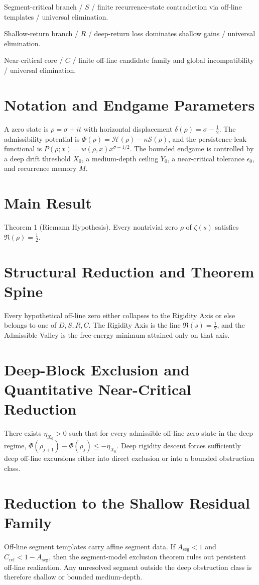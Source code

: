 \documentclass[11pt]{article}
\theoremstyle{definition}
\begin{document}
Segment-critical branch / $S$ / finite recurrence-state contradiction via off-line templates / universal elimination.

Shallow-return branch / $R$ / deep-return loss dominates shallow gains / universal elimination.

Near-critical core / $C$ / finite off-line candidate family and global incompatibility / universal elimination.
\section{Notation and Endgame Parameters}
A zero state is $\rho=\sigma+it$ with horizontal displacement $\delta(\rho)=\sigma-\tfrac12$. The admissibility potential is $\Phi(\rho)=\mathcal H(\rho)-\kappa \mathcal S(\rho)$, and the persistence-leak functional is $P(\rho;x)=w(\rho,x)x^{\sigma-1/2}$. The bounded endgame is controlled by a deep drift threshold $X_0$, a medium-depth ceiling $Y_0$, a near-critical tolerance $\epsilon_0$, and recurrence memory $M$.
\section{Main Result}
Theorem 1 (Riemann Hypothesis). Every nontrivial zero $\rho$ of $\zeta(s)$ satisfies $\Re(\rho)=\tfrac12$.
\section{Structural Reduction and Theorem Spine}
Every hypothetical off-line zero either collapses to the Rigidity Axis or else belongs to one of $D,S,R,C$. The Rigidity Axis is the line $\Re(s)=\tfrac12$, and the Admissible Valley is the free-energy minimum attained only on that axis.
\section{Deep-Block Exclusion and Quantitative Near-Critical Reduction}
There exists $\eta_{X_0}>0$ such that for every admissible off-line zero state in the deep regime, $\Phi(\rho_{j+1})-\Phi(\rho_j)\le -\eta_{X_0}$. Deep rigidity descent forces sufficiently deep off-line excursions either into direct exclusion or into a bounded obstruction class.
\section{Reduction to the Shallow Residual Family}
Off-line segment templates carry affine segment data. If $A_{\mathrm{seg}}<1$ and $C_{\mathrm{ref}}<1-A_{\mathrm{seg}}$, then the segment-model exclusion theorem rules out persistent off-line realization. Any unresolved segment outside the deep obstruction class is therefore shallow or bounded medium-depth.
\end{document}

